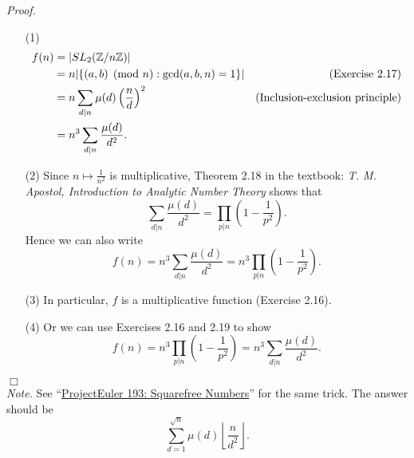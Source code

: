 \documentclass{article}
\begin{document}
\emph{Proof.}
\begin{enumerate}
\item[(1)]
  \begin{align*}
    f(n)
    &= \abs{ SL_2(\mathbb{Z}/n\mathbb{Z}) } \\
    &= n \abs{ \{ (a,b) \pmod{n} : \gcd(a,b,n) = 1 \} }
      &(\text{Exercise 2.17}) \\
    &= n \sum_{d|n} \mu(d)\left( \frac{n}{d} \right)^2
      &(\text{Inclusion-exclusion principle}) \\
    &= n^3 \sum_{d|n} \frac{\mu(d)}{d^2}.
  \end{align*}

\item[(2)]
  Since $n \mapsto \frac{1}{n^2}$ is multiplicative,
  Theorem 2.18 in the textbook: \emph{T. M. Apostol, Introduction to Analytic Number Theory}
  shows that
  \[
    \sum_{d|n} \frac{\mu(d)}{d^2} = \prod_{p|n} \left(1 - \frac{1}{p^2}\right).
  \]
  Hence we can also write
  \[
    f(n) = n^3 \sum_{d|n} \frac{\mu(d)}{d^2} = n^3 \prod_{p|n} \left(1 - \frac{1}{p^2}\right).
  \]

\item[(3)]
  In particular,
  $f$ is a multiplicative function (Exercise 2.16).

\item[(4)]
  Or we can use Exercises 2.16 and 2.19 to show
  \[
    f(n) = n^3 \prod_{p|n} \left(1 - \frac{1}{p^2}\right) = n^3 \sum_{d|n} \frac{\mu(d)}{d^2}.
  \]
\end{enumerate}
$\Box$ \\



\emph{Note.}
  See ``\href{https://projecteuler.net/problem=193}{ProjectEuler 193: Squarefree Numbers}''
  for the same trick.
  The answer should be
  \[
    \sum_{d=1}^{\sqrt{n}} \mu(d) \left\lfloor \frac{n}{d^2} \right\rfloor.
  \] \\\\



\end{document}
